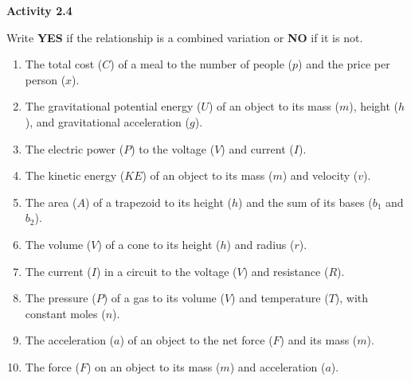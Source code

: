 \vspace{0.3ex}
\noindent\textbf{Activity 2.4}

\vspace{0.2ex}

Write \textbf{YES} if the relationship is a combined variation or \textbf{NO} if it is not.

\begin{enumerate}[noitemsep, label = \color{blue}\arabic*. ]
   \item The total cost ($C$) of a meal to the number of people ($p$) and the price per person ($x$).
   \item The gravitational potential energy ($U$) of an object to its mass ($m$), height ($h$), and gravitational acceleration ($g$).
   \item The electric power ($P$) to the voltage ($V$) and current ($I$).
   \item The kinetic energy ($KE$) of an object to its mass ($m$) and velocity ($v$).
   \item The area ($A$) of a trapezoid to its height ($h$) and the sum of its bases ($b_1$ and $b_2$).
   \item The volume ($V$) of a cone to its height ($h$) and radius ($r$).
   \item The current ($I$) in a circuit to the voltage ($V$) and resistance ($R$).
   \item The pressure ($P$) of a gas to its volume ($V$) and temperature ($T$), with constant moles ($n$).
   \item The acceleration ($a$) of an object to the net force ($F$) and its mass ($m$).
   \item The force ($F$) on an object to its mass ($m$) and acceleration ($a$).
\end{enumerate}
